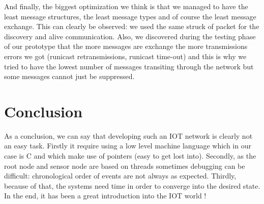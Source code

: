 \documentclass[a4paper,10pt]{article}
\begin{document}
And finally, the biggest optimization we think is that we managed to have the least message structures, the least message types and of course the least message exchange. This can clearly be observed: we used the same struck of packet for the discovery and alive communication. Also, we discovered during the testing phase of our prototype that the more messages are exchange the more transmissions errors we got (runicast retransmissions, runicast time-out) and this is why we tried to have the lowest number of messages transiting through the network but some messages cannot just be suppressed.

\section{Conclusion}

As a conclusion, we can say that developing such an IOT network is clearly not an easy task. Firstly it require using a low level machine language which in our case is C and which make use of pointers (easy to get lost into). Secondly, as the root node and sensor node are based on threads sometimes debugging can be difficult: chronological order of events are not always as expected. Thirdly, because of that, the systems need time in order to converge into the desired state. In the end, it has been a great introduction into the IOT world !
\end{document}
